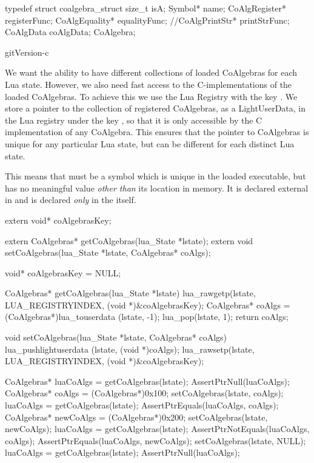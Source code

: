 typedef struct coalgebra_struct {
  size_t         isA;
  Symbol*        name;
  CoAlgRegister* registerFunc;
  CoAlgEquality* equalityFunc;
  //CoAlgPrintStr* printStrFunc;
  CoAlgData      coAlgData;
} CoAlgebra;
\stopCHeader

\component gitVersion-c


We want the ability to have different collections of loaded CoAlgebras for 
each Lua state. However, we also need fast access to the C-implementations 
of the loaded CoAlgebras. To achieve this we use the Lua Registry with the 
 key . We store a pointer to the 
collection of registered CoAlgebras, as a LightUserData, in the Lua 
registry under the key , so that it is only accessible 
by the C implementation of any CoAlgebra. This ensures that the pointer to 
CoAlgebras is unique for any particular Lua state, but can be different 
for each distinct Lua state. 

This means that  must be a symbol which is unique in 
the loaded executable, but has no meaningful value \emph{other than} its 
location in memory. It is declared external in  and is 
declared \emph{only} in the  itself. 

\startCHeader
extern void* coAlgebrasKey;

extern CoAlgebras* getCoAlgebras(lua_State *lstate);
extern void setCoAlgebras(lua_State *lstate, CoAlgebras* coAlgs);
\stopCHeader

\startCCode
void* coAlgebrasKey = NULL;

CoAlgebras* getCoAlgebras(lua_State *lstate) {
  lua_rawgetp(lstate, LUA_REGISTRYINDEX, (void *)&coAlgebrasKey);
  CoAlgebras* coAlgs = (CoAlgebras*)lua_touserdata (lstate, -1);
  lua_pop(lstate, 1);
  return coAlgs;
}

void setCoAlgebras(lua_State *lstate, CoAlgebras* coAlgs) {
  lua_pushlightuserdata (lstate, (void *)coAlgs);
  lua_rawsetp(lstate, LUA_REGISTRYINDEX, (void *)&coAlgebrasKey);
}
\stopCCode


\startCTest
  CoAlgebras* luaCoAlgs = getCoAlgebras(lstate);
  AssertPtrNull(luaCoAlgs);
  CoAlgebras* coAlgs = (CoAlgebras*)0x100;
  setCoAlgebras(lstate, coAlgs);
  luaCoAlgs = getCoAlgebras(lstate);
  AssertPtrEquals(luaCoAlgs, coAlgs);
  CoAlgebras* newCoAlgs = (CoAlgebras*)0x200;
  setCoAlgebras(lstate, newCoAlgs);
  luaCoAlgs = getCoAlgebras(lstate);
  AssertPtrNotEquals(luaCoAlgs, coAlgs);
  AssertPtrEquals(luaCoAlgs, newCoAlgs);
  setCoAlgebras(lstate, NULL);
  luaCoAlgs = getCoAlgebras(lstate);
  AssertPtrNull(luaCoAlgs);
\stopCTest
\stopTestCase
\stopTestSuite

